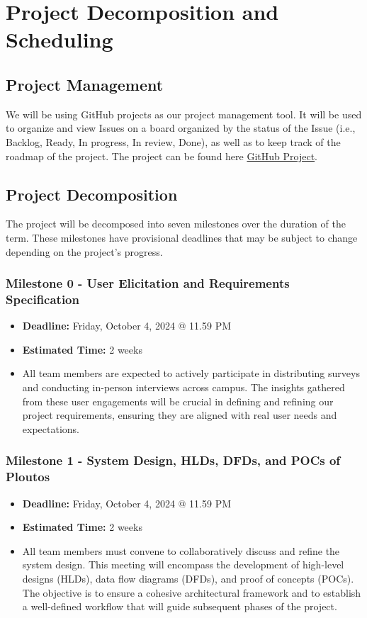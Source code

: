 \documentclass{article}
\begin{document}
\newpage

\section{Project Decomposition and Scheduling}

\subsection{Project Management}
We will be using GitHub projects as our project management tool. It will be used
to organize and view Issues on a board organized by the status of the Issue
(i.e., Backlog, Ready, In progress, In review, Done), as well as to keep track
of the roadmap of the project. The project can be found here
\href{https://github.com/orgs/PlutosCapstone/projects/1/views/1}{GitHub
Project}.

\subsection{Project Decomposition}
The project will be decomposed into seven milestones over the duration of the
term. These milestones have provisional deadlines that may be subject to change
depending on the project's progress.

\subsubsection*{Milestone 0 - User Elicitation and Requirements Specification}
\begin{itemize}
    \item \textbf{Deadline:} Friday, October 4, 2024 @ 11.59 PM
    \item \textbf{Estimated Time:} 2 weeks
    \item All team members are expected to actively participate in distributing
    surveys and conducting in-person interviews across campus. The insights
    gathered from these user engagements will be crucial in defining and
    refining our project requirements, ensuring they are aligned with real user
    needs and expectations.
\end{itemize}

\subsubsection*{Milestone 1 - System Design, HLDs, DFDs, and POCs of Ploutos}
\begin{itemize}
    \item \textbf{Deadline:} Friday, October 4, 2024 @ 11.59 PM
    \item \textbf{Estimated Time:} 2 weeks
    \item All team members must convene to collaboratively discuss and refine
    the system design. This meeting will encompass the development of high-level
    designs (HLDs), data flow diagrams (DFDs), and proof of concepts (POCs). The
    objective is to ensure a cohesive architectural framework and to establish a
    well-defined workflow that will guide subsequent phases of the project.
\end{itemize}
\end{document}
